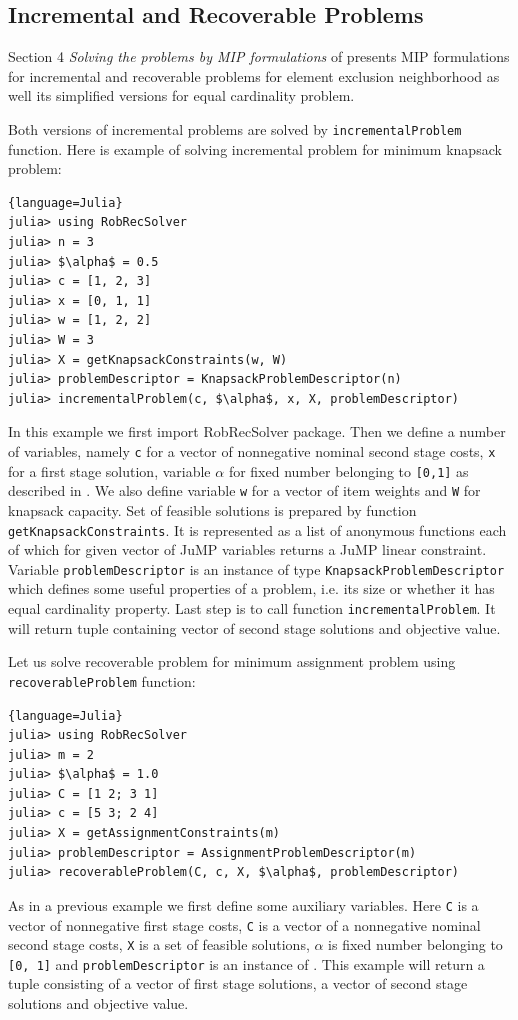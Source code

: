 \subsection{Incremental and Recoverable Problems}
Section 4 \textit{Solving the problems by MIP formulations} of \cite{HKZ19} presents MIP formulations for incremental and recoverable problems for element exclusion neighborhood as well its simplified versions for equal cardinality problem.

Both versions of incremental problems are solved by \texttt{incrementalProblem} function. Here is example of solving incremental problem for minimum knapsack problem:
\begin{lstlisting}[mathescape]{language=Julia}
julia> using RobRecSolver
julia> n = 3
julia> $\alpha$ = 0.5
julia> c = [1, 2, 3]
julia> x = [0, 1, 1]
julia> w = [1, 2, 2]
julia> W = 3
julia> X = getKnapsackConstraints(w, W)
julia> problemDescriptor = KnapsackProblemDescriptor(n)
julia> incrementalProblem(c, $\alpha$, x, X, problemDescriptor)
\end{lstlisting}
In this example we first import RobRecSolver package. Then we define a number of variables, namely \texttt{c} for a vector of nonnegative nominal second stage costs, \texttt{x} for a first stage solution, variable \texttt{$\alpha$} for fixed number belonging to \texttt{[0,1]} as described in \cite{HKZ19}. We also define variable \texttt{w} for a vector of item weights and \texttt{W} for knapsack capacity. Set of feasible solutions is prepared by function \texttt{getKnapsackConstraints}. It is represented as a list of anonymous functions each of which for given vector of JuMP variables returns a JuMP linear constraint. Variable \texttt{problemDescriptor} is an instance of type \texttt{KnapsackProblemDescriptor} which defines some useful properties of a problem, i.e. its size or whether it has equal cardinality property. Last step is to call function \texttt{incrementalProblem}. It will return tuple containing vector of second stage solutions and objective value.

Let us solve recoverable problem for minimum assignment problem using \texttt{recoverableProblem} function:
\begin{lstlisting}[mathescape]{language=Julia}
julia> using RobRecSolver
julia> m = 2
julia> $\alpha$ = 1.0
julia> C = [1 2; 3 1]
julia> c = [5 3; 2 4]
julia> X = getAssignmentConstraints(m)
julia> problemDescriptor = AssignmentProblemDescriptor(m)
julia> recoverableProblem(C, c, X, $\alpha$, problemDescriptor)
\end{lstlisting}
As in a previous example we first define some auxiliary variables. Here  \texttt{C} is a vector of nonnegative first stage costs,  \texttt{C} is a vector of a nonnegative nominal second stage costs, \texttt{X} is a set of feasible solutions,  \texttt{$\alpha$} is fixed number belonging to \texttt{[0, 1]} and \texttt{problemDescriptor} is an instance of \texttt{}. This example will return a tuple consisting of a vector of first stage solutions, a vector of second stage solutions and objective value.

